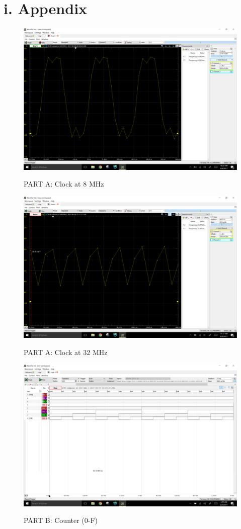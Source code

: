 \documentclass[11pt]{article}
\theoremstyle{plain}
\theoremstyle{definition}
\begin{document}
\section*{i. Appendix}
\begin{figure}[H]
	\centering
	\includegraphics[width=\textwidth]{2a8mhz}
	\label{fig:a0}
	\caption{PART A: Clock at 8 MHz}
\end{figure}
\begin{figure}[H]
	\centering
	\includegraphics[width=\textwidth]{2a32mhz}
	\label{fig:a1}
	\caption{PART A: Clock at 32 MHz}
\end{figure}
\begin{figure}[H]
	\centering
	\includegraphics[width=\textwidth]{2b}
	\label{fig:c}
	\caption{PART B: Counter (0-F)}
\end{figure}
\end{document}
